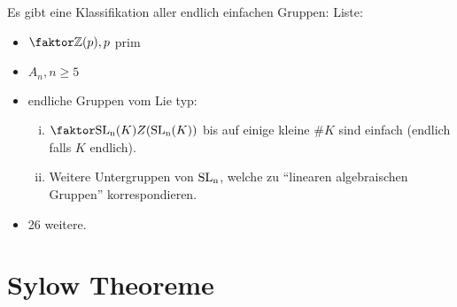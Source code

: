 \documentclass[a4paper]{report}
\begin{document}
\begin{bem*}
  Es gibt eine Klassifikation aller endlich einfachen Gruppen:
  Liste:
  \begin{itemize}
    \item $\fak \Z{(p)}, p$ prim
    \item $A_{n}, n \ge 5$
    \item endliche Gruppen vom Lie typ:
          \begin{enumerate}[(i)]
            \item $\fak {\SLn(K)}{Z(\SLn(K))}$ bis auf einige kleine $\#K$ sind einfach (endlich falls $K$ endlich).
            \item Weitere Untergruppen von $\operatorname{SL_n}$, welche zu ``linearen algebraischen Gruppen'' korrespondieren.
          \end{enumerate}
          \item 26 weitere.
  \end{itemize}
\end{bem*}

\section{Sylow Theoreme}
\end{document}

